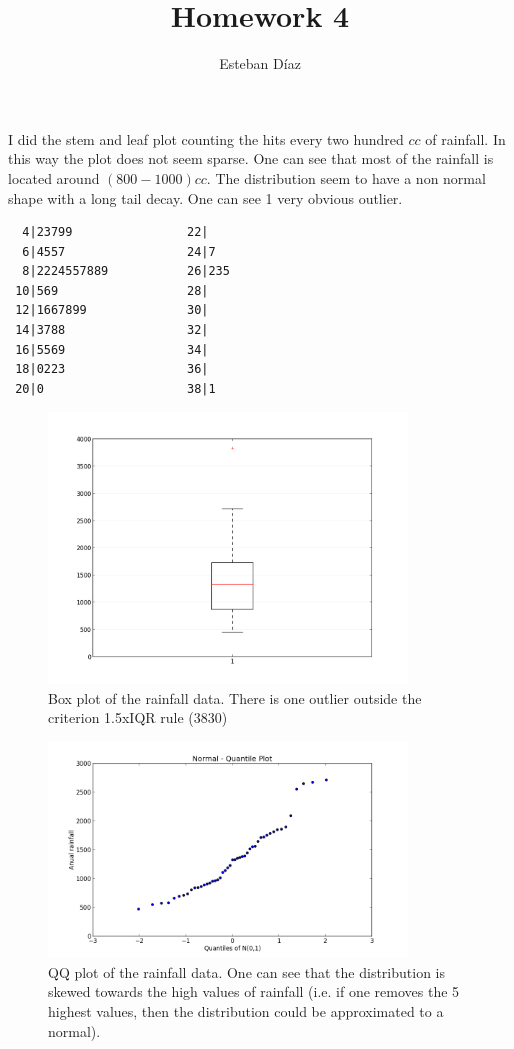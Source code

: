 \documentclass[10pt]{article}
\author{Esteban D\'{i}az}
\title{Homework 4}{}
\begin{document}
\maketitle

I did the stem and leaf plot counting the hits every
two hundred $cc$ of rainfall. In this way the plot does
not seem sparse. One can see that most of the rainfall
is located around $(800-1000)cc$. The distribution 
seem to have a non normal shape with a long tail decay.
One can see 1 very obvious outlier.

\begin{verbatim}
  4|23799                22| 
  6|4557                 24|7  
  8|2224557889           26|235
 10|569                  28|
 12|1667899              30|
 14|3788                 32|
 16|5569                 34| 
 18|0223                 36| 
 20|0                    38|1
\end{verbatim}



\begin{figure}[H]
    \centering
    \includegraphics[width=0.85\textwidth]{boxplot.png}
    \caption{Box plot of the rainfall data. There is one outlier outside the criterion 1.5xIQR rule (3830)}
    \label{fig:fig1}
\end{figure}

\begin{figure}[H]
    \centering
    \includegraphics[width=0.85\textwidth]{qqplot.png}
    \caption{QQ plot of the rainfall data. One can see that the distribution  is skewed towards the high values of rainfall (i.e. if one removes the 5 highest values, then the distribution could be approximated to a normal). }
    \label{fig:fig2}
\end{figure}
\end{document}

